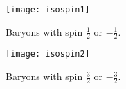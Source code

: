 \begin{figure}\begin{center}
\texttt{[image: isospin1]}
\caption{Baryons with spin $\frac{1}{2}$ or $-\frac{1}{2}$.}\label{fig:isospin1}
\end{center}\end{figure}

\begin{figure}\begin{center}
\texttt{[image: isospin2]}
\caption{Baryons with spin $\frac{3}{2}$ or $-\frac{3}{2}$.}\label{fig:isospin2}
\end{center}\end{figure}




